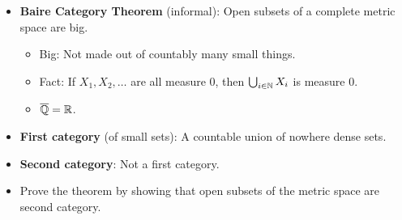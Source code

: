 \documentclass[../apprentice.tex]{subfiles}
\begin{document}
\begin{itemize}
    \item \textbf{Baire Category Theorem} (informal): Open subsets of a complete metric space are big.
    \begin{itemize}
        \item Big: Not made out of countably many small things.
        \item Fact: If $X_1,X_2,\dots$ are all measure 0, then $\bigcup_{i\in\mathbb{N}}X_i$ is measure 0.
        \item $\overline{\mathbb{Q}}=\mathbb{R}$.
    \end{itemize}
    \item \textbf{First category} (of small sets): A countable union of nowhere dense sets.
    \item \textbf{Second category}: Not a first category.
    \item Prove the theorem by showing that open subsets of the metric space are second category.
\end{itemize}
\end{document}
